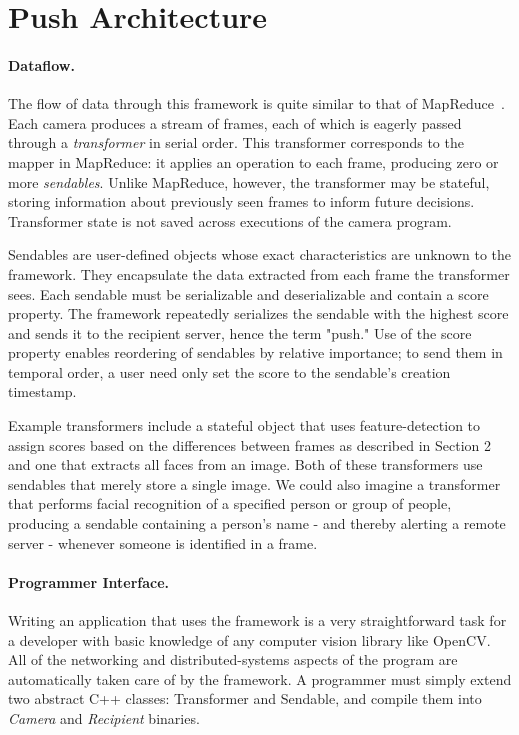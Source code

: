 \section{Push Architecture}

\paragraph{Dataflow.}

The flow of data through this framework is quite similar to that of MapReduce~\cite{mapreduce}.
Each camera produces a stream of frames, each of which is eagerly passed
through a \emph{transformer} in serial order.  This transformer corresponds to
the mapper in MapReduce: it applies an operation to each frame, producing
zero or more \emph{sendables}.  Unlike MapReduce, however, the transformer may be
stateful, storing information about previously seen frames to inform future decisions.
Transformer state is not saved across executions of the camera program.

Sendables are user-defined objects whose exact
characteristics are unknown to the framework.  They encapsulate the data extracted
from each frame the transformer sees.  Each sendable
must be serializable and deserializable and contain a score property.  The
framework repeatedly serializes the sendable with the highest score and sends
it to the recipient server, hence the term "push."  Use of the score property enables reordering of sendables
by relative importance; to send them in temporal order, a user need only set the
score to the sendable's creation timestamp.

Example transformers include a stateful object that uses feature-detection to assign scores
based on the differences between frames as described in Section 2 and
one that extracts all faces from an image.  Both of these transformers use sendables
that merely store a single image.  We could also imagine a transformer that performs facial recognition
of a specified person or group of people, producing a sendable containing a person's name -
and thereby alerting a remote server - whenever someone is identified in a frame.

\paragraph{Programmer Interface.}

Writing an application that uses the framework is a very straightforward
task for a developer with basic knowledge of any computer vision library like OpenCV.  All of the
networking and distributed-systems aspects of the program are automatically
taken care of by the framework.  A programmer must simply extend two
abstract C++ classes: Transformer and Sendable, and compile them into
\emph{Camera} and \emph{Recipient} binaries.

